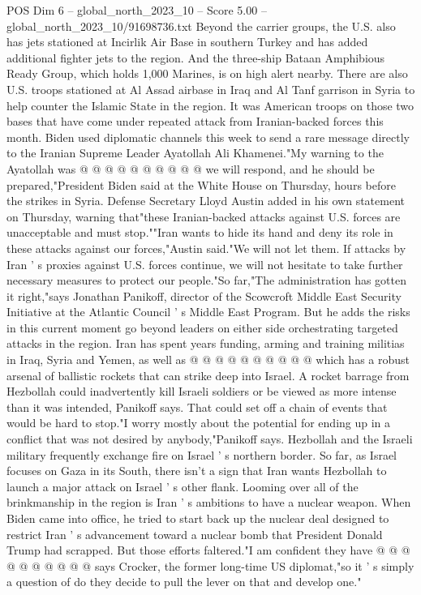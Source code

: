 \begin{textsample}{POS Dim 6 – global\_north\_2023\_10 – Score 5.00 – global\_north\_2023\_10/91698736.txt}
Beyond the carrier groups, the U.S. also has jets stationed at Incirlik Air Base in southern Turkey and has added additional fighter jets to the region.
And the three-ship Bataan Amphibious Ready Group, which holds 1,000 Marines, is on high alert nearby.
There are also U.S. troops stationed at Al Assad airbase in Iraq and Al Tanf garrison in Syria to help counter the Islamic State in the region.
It was American troops on those two bases that have come under repeated attack from Iranian-backed forces this month.
Biden used diplomatic channels this week to send a rare message directly to the Iranian Supreme Leader Ayatollah Ali Khamenei."My warning to the Ayatollah was @ @ @ @ @ @ @ @ @ @ we will respond, and he should be prepared,"President Biden said at the White House on Thursday, hours before the strikes in Syria.
Defense Secretary Lloyd Austin added in his own statement on Thursday, warning that"these Iranian-backed attacks against U.S. forces are unacceptable and must stop.""Iran wants to hide its hand and deny its role in these attacks against our forces,"Austin said."We will not let them.
If attacks by Iran ' s proxies against U.S. forces continue, we will not hesitate to take further necessary measures to protect our people."So far,"The administration has gotten it right,"says Jonathan Panikoff, director of the Scowcroft Middle East Security Initiative at the Atlantic Council ' s Middle East Program.
But he adds the risks in this current moment go beyond leaders on either side orchestrating targeted attacks in the region.
Iran has spent years funding, arming and training militias in Iraq, Syria and Yemen, as well as @ @ @ @ @ @ @ @ @ @ which has a robust arsenal of ballistic rockets that can strike deep into Israel.
A rocket barrage from Hezbollah could inadvertently kill Israeli soldiers or be viewed as more intense than it was intended, Panikoff says.
That could set off a chain of events that would be hard to stop."I worry mostly about the potential for ending up in a conflict that was not desired by anybody,"Panikoff says.
Hezbollah and the Israeli military frequently exchange fire on Israel ' s northern border.
So far, as Israel focuses on Gaza in its South, there isn't a sign that Iran wants Hezbollah to launch a major attack on Israel ' s other flank.
Looming over all of the brinkmanship in the region is Iran ' s ambitions to have a nuclear weapon.
When Biden came into office, he tried to start back up the nuclear deal designed to restrict Iran ' s advancement toward a nuclear bomb that President Donald Trump had scrapped.
But those efforts faltered."I am confident they have @ @ @ @ @ @ @ @ @ @ says Crocker, the former long-time US diplomat,"so it ' s simply a question of do they decide to pull the lever on that and develop one."

\end{textsample}

